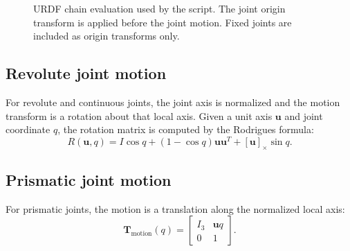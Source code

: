\documentclass[11pt,a4paper]{article}
\newcommand{\T}{\mathbf{T}}
\begin{document}
\begin{figure}[htbp]
\centering
{}
\caption{URDF chain evaluation used by the script. The joint origin transform is applied before the joint motion. Fixed joints are included as origin transforms only.}
\end{figure}

\subsection{Revolute joint motion}

For revolute and continuous joints, the joint axis is normalized and the motion transform is a rotation about that local axis. Given a unit axis $\bm{u}$ and joint coordinate $q$, the rotation matrix is computed by the Rodrigues formula:
\begin{equation}
  R(\bm{u},q) = I\cos q + (1-\cos q)\bm{u}\bm{u}^T + [\bm{u}]_\times \sin q.
\end{equation}

\subsection{Prismatic joint motion}

For prismatic joints, the motion is a translation along the normalized local axis:
\begin{equation}
  \T_{\mathrm{motion}}(q) =
  \begin{bmatrix}
    I_3 & \bm{u}q \\
    0 & 1
  \end{bmatrix}.
\end{equation}
\end{document}
